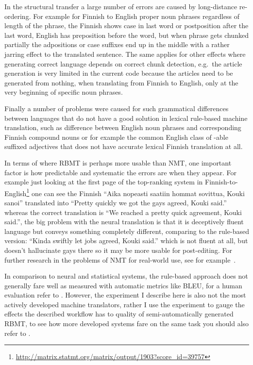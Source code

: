\documentclass[11pt,a4paper]{article}
\begin{document}
In the structural transfer a large number of errors are caused by long-distance
re-ordering. For example for Finnish to English proper noun phrases regardless
of length of the phrase, the Finnish shows case in last word or postposition
after the last word, English has preposition before the word, but when phrase
gets chunked partially the adpositions or case suffixes end up in the middle
with a rather jarring effect to the translated sentence. The same applies for
other effects where generating correct language depends on correct chunk
detection, e.g.\ the article generation is very limited in the current code
because the articles need to be generated from nothing, when translating from
Finnish to English, only at the very beginning of specific noun phrases.

Finally a number of problems were caused for such grammatical differences
between languages that do not have a good solution in lexical rule-based machine
translation, such as difference between English noun phrases and corresponding
Finnish compound nouns or for example the common English class of -able suffixed
adjectives that does not have accurate lexical Finnish translation at all.

In terms of where RBMT is perhaps more usable than NMT, one important factor is
how predictable and systematic the errors are when they appear. For example just
looking at the first page of the top-ranking system in
Finnish-to-English\footnote{\url{http://matrix.statmt.org/matrix/output/1903?score_id=39757}} one can
see the Finnish ``Aika nopeasti saatiin hommat sovittua, Kouki sanoi'' translated into
``Pretty quickly we got the gays agreed, Kouki said.'' whereas the correct translation
is ``We reached a pretty quick agreement, Kouki said.'', the big  problem with the neural
translation is that it is deceptively fluent language but conveys something completely
different, comparing to the rule-based version: ``Kinda swiftly let jobs agreed, Kouki said.'' which
is not fluent at all, but doesn't hallucinate gays there so it may be more usable for
post-editing. For further research in the problems of NMT for real-world use, see for
example~\citet{moorkens2018translators}. 

In comparison to neural and statistical systems, the rule-based approach does not
generally fare well as measured with automatic metrics like BLEU, for a human
evaluation refer to \cite{bojar-EtAl:2019:WMT2}. However, the experiment I describe here is also 
not the most actively developed machine translators, rather I use the experiment
to gauge the effects the described workflow has to quality of semi-automatically
generated RBMT, to see how more developed systems fare on the same task you
should also refer to \cite{hurskainen2017rule,kolachina2015gf}. 
\end{document}
